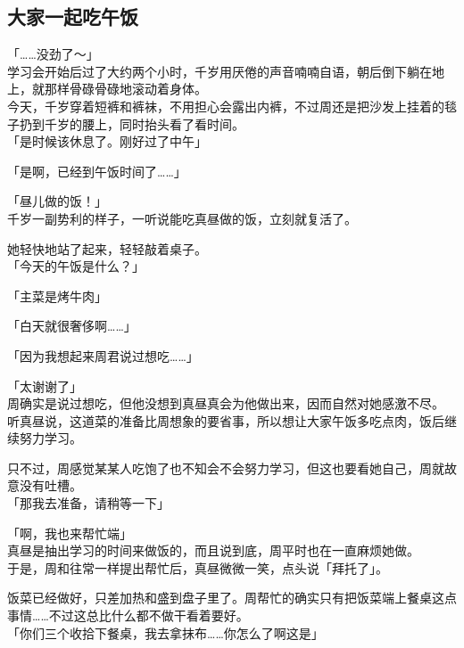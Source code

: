 \subsection{大家一起吃午饭}

「……没劲了～」\\

学习会开始后过了大约两个小时，千岁用厌倦的声音喃喃自语，朝后倒下躺在地上，就那样骨碌骨碌地滚动着身体。\\

今天，千岁穿着短裤和裤袜，不用担心会露出内裤，不过周还是把沙发上挂着的毯子扔到千岁的腰上，同时抬头看了看时间。\\

「是时候该休息了。刚好过了中午」

「是啊，已经到午饭时间了……」

「昼儿做的饭！」\\

千岁一副势利的样子，一听说能吃真昼做的饭，立刻就复活了。

她轻快地站了起来，轻轻敲着桌子。\\

「今天的午饭是什么？」

「主菜是烤牛肉」

「白天就很奢侈啊……」

「因为我想起来周君说过想吃……」

「太谢谢了」\\

周确实是说过想吃，但他没想到真昼真会为他做出来，因而自然对她感激不尽。\\

听真昼说，这道菜的准备比周想象的要省事，所以想让大家午饭多吃点肉，饭后继续努力学习。

只不过，周感觉某某人吃饱了也不知会不会努力学习，但这也要看她自己，周就故意没有吐槽。\\

「那我去准备，请稍等一下」

「啊，我也来帮忙端」\\

真昼是抽出学习的时间来做饭的，而且说到底，周平时也在一直麻烦她做。\\

于是，周和往常一样提出帮忙后，真昼微微一笑，点头说「拜托了」。

饭菜已经做好，只差加热和盛到盘子里了。周帮忙的确实只有把饭菜端上餐桌这点事情……不过这总比什么都不做干看着要好。\\

「你们三个收拾下餐桌，我去拿抹布……你怎么了啊这是」

